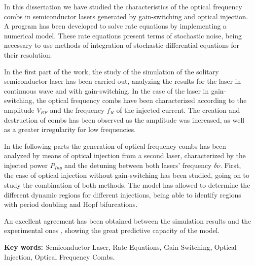 \documentclass[a4paper, 11pt, oneside]{book}
\begin{document}
				In this dissertation we have studied the characteristics of the optical frequency combs in semiconductor lasers generated by gain-switching and optical injection. A program has been developed to solve rate equations by implementing a numerical model. These rate equations present terms of stochastic noise, being necessary to use methods of integration of stochastic differential equations for their resolution. 
				
				In the first part of the work, the study of the simulation of the solitary semiconductor laser has been carried out, analyzing the results for the laser in continuous wave and with gain-switching. In the case of the laser in gain-switching, the optical frequency combs have been characterized according to the amplitude $V_{RF}$ and the frequency $f_R$ of the injected current. The creation and destruction of combs has been observed as the amplitude was increased, as well as a greater irregularity for low frequencies.

				In the following parts the generation of optical frequency combs has been analyzed by means of optical injection from a second laser, characterized by the injected power $P_{Iny}$ and the detuning between both lasers' frequency $\delta\nu$. First, the case of optical injection without gain-switching has been studied, going on to study the combination of both methods. The model has allowed to determine the different dynamic regions for different injections, being able to identify regions with period doubling and Hopf bifurcations.

				An excellent agreement has been obtained between the simulation results and the experimental ones \cite{artSim, Chaves19} , showing the great predictive capacity of the model.

			\begin{center}
				\textbf{Key words:} Semiconductor Laser, Rate Equations, Gain Switching, Optical Injection, Optical Frequency Combs. 
			\end{center}


		\tableofcontents



\end{document}
